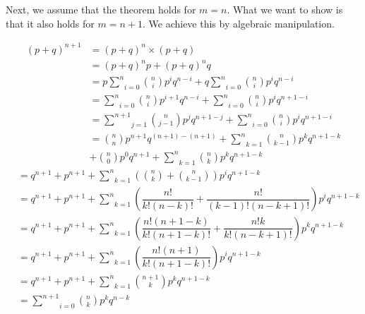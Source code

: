 Next, we assume that the theorem holds for $ m = n $. What we want to show is that it also holds for
$ m = n + 1 $. We achieve this by algebraic manipulation.

\begin{align}
(p + q)^{n+1} &= (p + q)^{n} \times (p + q) \\
&= (p+q)^{n}p + (p+q)^{n}q \\
&= p\underset{i=0}{\overset{n}{\sum}} \binom{n}{i} p^{i}q^{n-i} + q\underset{i=0}{\overset{n}{\sum}} \binom{n}{i} p^{i}q^{n-i} \label{indcutiveHyp} \\
&= \underset{i=0}{\overset{n}{\sum}} \binom{n}{i} p^{i+1}q^{n-i} + \underset{i=0}{\overset{n}{\sum}} \binom{n}{i} p^{i}q^{n+1-i} \\
&= \underset{j=1}{\overset{n+1}{\sum}} \binom{n}{j-1} p^{j}q^{n+1-j} + \underset{i=0}{\overset{n}{\sum}} \binom{n}{i} p^{i}q^{n+1-i} \label{variableSwitch} \\
&= \binom{n}{n} p^{n+1}q^{(n+1)-(n+1)} + \underset{k=1}{\overset{n}{\sum}} \binom{n}{k-1} p^{k}q^{n+1-k} \label{pullOut} \\
&+ \binom{n}{0} p^{0}q^{n+1} + \underset{k=1}{\overset{n}{\sum}} \binom{n}{k} p^{k}q^{n+1-k} \nonumber \label{collapseSums}
\end{align}
\begin{align}
&= q^{n+1} + p^{n+1} + \underset{k=1}{\overset{n}{\sum}} \left(\binom{n}{k} + \binom{n}{k-1}\right) p^{i}q^{n+1-k} \\
&= q^{n+1} + p^{n+1} + \underset{k=1}{\overset{n}{\sum}} \left(\dfrac{n!}{k!(n-k)!} + \dfrac{n!}{(k-1)!(n-k+1)!}\right) p^{i}q^{n+1-k} \\
&= q^{n+1} + p^{n+1} + \underset{k=1}{\overset{n}{\sum}} \left(\dfrac{n!(n+1-k)}{k!(n+1-k)!} + \dfrac{n!k}{k!(n-k+1)!}\right) p^{k}q^{n+1-k} \\
&= q^{n+1} + p^{n+1} + \underset{k=1}{\overset{n}{\sum}} \left(\dfrac{n!(n+1)}{k!(n+1-k)!}\right) p^{i}q^{n+1-k} \\
&= q^{n+1} + p^{n+1} + \underset{k=1}{\overset{n}{\sum}} \binom{n+1}{k} p^{k}q^{n+1-k} \\
&= \underset{i=0}{\overset{n+1}{\sum}} \binom{n}{k} p^{k}q^{n-k}
\end{align}

